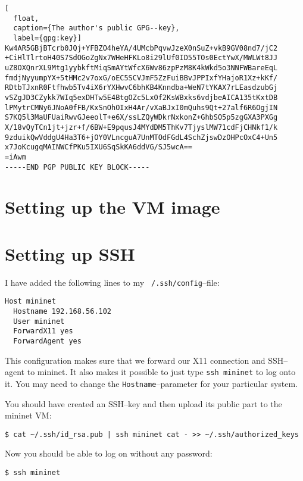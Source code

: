 \begin{lstlisting}[
  float,
  caption={The author's public GPG--key},
  label={gpg:key}]
Kw4AR5GBjBTcrb0JQj+YFBZO4heYA/4UMcbPqvwJzeX0nSuZ+vkB9GV08nd7/jC2
+CiHlTlrtoH40S7SdOGoZgNx7WHeHFKLo8i29lUf0ID55TOs0EctYwX/MWLWt8JJ
uZ8OXQnrXL9Mtg1yybkftMiqSmAYtWfcX6Wv86zpPzM8K4kWkd5o3NNFWBareEqL
fmdjNyyumpYX+5tHMc2v7oxG/oEC5SCVJmF5ZzFuiBBvJPPIxfYHajoR1Xz+kKf/
RDtbTJxnR0Ftfhwb5Tv4iX6rYXHwvC6bhKB4Knndba+WeN7tYKAX7rLEasdzubGj
vSZgJD3CZykk7WIq5exDHTw5E4BtgOZc5LxOf2KsWBxks6vdjbeAICA135tKxtDB
lPMytrCMNy6JNoA0fFB/KxSnOhOIxH4Ar/vXaBJxI0mQuhs9Qt+27alf6R6OgjIN
S7KQ5l3MaUFUaiRwvGJeeolT+e6X/ssLZQyWDkrNxkonZ+GhbSO5p5zgGXA3PXGg
X/18vQyTCn1jt+jzr+f/6BW+E9pqusJ4MYdDM5ThKv7TjyslMW71cdFjCHNkf1/k
9zduikQwVddgU4Ha3T6+jOY0VLncguA7UnMTOdFGdL4SchZjswDzOHPcOxC4+Un5
x7JoKcugqMAINWCfPKu5IXU6SqSkKA6ddVG/SJ5wcA==
=iAwm
-----END PGP PUBLIC KEY BLOCK-----
\end{lstlisting}
\clearpage %

\section{Setting up the VM image}


\section{Setting up SSH}

I have added the following lines to my \texttt{~/.ssh/config}--file:

\begin{verbatim}
Host mininet
  Hostname 192.168.56.102
  User mininet
  ForwardX11 yes
  ForwardAgent yes
\end{verbatim}

This configuration makes sure that we forward our X11 connection and
SSH--agent to mininet.  It also makes it possible to just type \texttt{ssh
mininet} to log onto it.  You may need to change the
\texttt{Hostname}--parameter for your particular system.

You should have created an SSH--key and then upload its public part to the
mininet VM:

\begin{verbatim}
$ cat ~/.ssh/id_rsa.pub | ssh mininet cat - >> ~/.ssh/authorized_keys
\end{verbatim}

Now you should be able to log on without any password:

\begin{verbatim}
$ ssh mininet
\end{verbatim}

